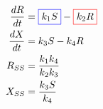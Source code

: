 \documentclass[preview]{standalone}
\begin{document}
\pagestyle{empty}
\begin{equation*}
\begin{aligned}
	\frac{dR}{dt} & = {\color{blue}\boxed{\color{black} k_1 S }} - \color{red}{\boxed{\color{black} k_2 R}} \\ 
	\frac{dX}{dt} & = {k_3 S } - {k_4 R} \\ 
	R_{SS} & = \frac{k_1 k_4}{k_2 k_3} \\
	X_{SS} & = \frac{k_3 S}{k_4} \\
\end{aligned}
\end{equation*}
\vfill
\end{document}
